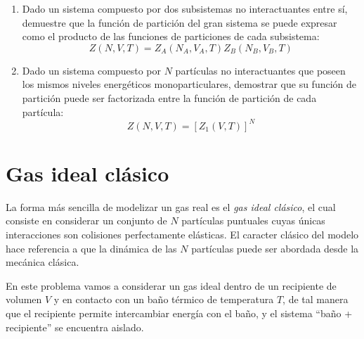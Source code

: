 \documentclass[a4paper,11pt]{article}
\begin{document}
\begin{enumerate}[label=(\alph*),
                  leftmargin=2\parindent,
                  rightmargin=2\parindent]

    \item{Dado un sistema compuesto por dos subsistemas no interactuantes entre sí,
          demuestre que la función de partición del gran sistema se puede expresar
          como el producto de las funciones de particiones de cada subsistema:
          $$ Z(N, V, T) = Z_A(N_A, V_A, T) Z_B(N_B, V_B, T) $$
          }

    \item{Dado un sistema compuesto por $N$ partículas no interactuantes que poseen los
          mismos niveles energéticos monoparticulares, demostrar que su función de
          partición puede ser factorizada entre la función de partición de cada
          partícula:
          $$ Z(N, V, T) = [Z_1(V, T)]^N $$
          }

\end{enumerate}


\section{Gas ideal clásico}
\label{sec:gas-ideal}

La forma más sencilla de modelizar un gas real es el \emph{gas ideal
clásico}, el cual consiste en considerar un conjunto de $N$ partículas
puntuales cuyas únicas interacciones son colisiones
perfectamente elásticas.
El caracter clásico del modelo hace referencia a que la dinámica de
las $N$ partículas puede ser abordada desde la mecánica clásica.

En este problema vamos a considerar un gas ideal dentro de un
recipiente de volumen $V$ y en contacto con un baño térmico de
temperatura $T$, de tal manera que el recipiente permite intercambiar
energía con el baño, y el sistema ``baño + recipiente'' se encuentra
aislado.
\end{document}
